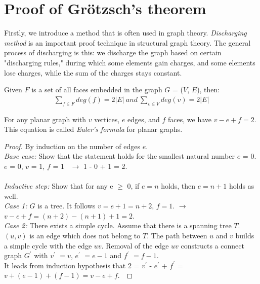 \section{Proof of Grötzsch's theorem}
Firstly, we introduce a method that is often used in graph theory. 
\textit{Discharging method} is an important proof technique in structural graph theory. The general process of discharging is this: we discharge the graph based on certain "discharging rules," during which some elements gain charges, and some elements lose charges, while the sum of the charges stays constant. \cite{wu2020introduction}

\begin{observation} Given $F$ is a set of all faces embedded in the graph $G$ = ($V$, $E$), then:
\begin{align*}
    \sum_{f \in F}deg(f) = 2|E| \ and \ \sum_{v \in V}deg(v) = 2|E|
\end{align*}
\end{observation}

\begin{theorem}
For any planar graph with $v$ vertices, $e$ edges, and $f$ faces, we have $v - e + f = 2$. This equation is called \textit{Euler's formula} for planar graphs. \cite{Discrete_Mathematics}
\end{theorem}

\begin{proof}
By induction on the number of edges $e$.\\
\textit{Base case: } Show that the statement holds for the smallest natural number $e$ = 0.\\
$e$ = 0, $v$ = 1, $f$ = 1 \ $\xrightarrow{}$ 1 - 0 + 1 = 2. \\
\\
\textit{Inductive step: }Show that for any e $\geq$ 0, if $e = n$ holds, then $e = n + 1$ holds as well. \\
\textit{Case 1: }$G$ is a tree. It follows $v = e + 1 = n + 2$, $f = 1$. $\longrightarrow$ $v - e + f = (n + 2) - (n+1) + 1 = 2$.\\
\textit{Case 2: }There exists a simple cycle. Assume that there is a spanning tree $T$. $(u, v)$ is an edge which does not belong to $T$. The path between $u$ and $v$ builds a simple cycle with the edge $uv$. Removal of the edge $uv$ constructs a connect graph $G^{'}$ with $v^{'}$ $ = v$, $e^{'}$ $=e - 1$ and $f^{'}$ $= f - 1$. \\
It leads from induction hypothesis that 2 = $v^{'}$ - $e^{'}$ + $f^{'}$ = $v + (e - 1) + (f - 1) = v - e + f$.\
\end{proof}

